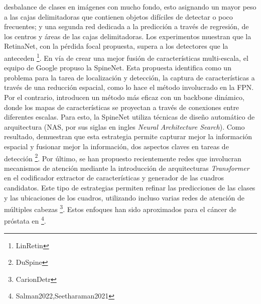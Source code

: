 desbalance de clases en imágenes con mucho fondo, esto asignando un mayor peso a las cajas delimitadoras que contienen objetos difíciles de detectar o poco frecuentes; y una segunda red dedicada a la predicción a través de regresión, de los centros y áreas de las cajas delimitadoras. Los experimentos muestran que la RetinaNet, con la pérdida focal propuesta, supera a los detectores que la anteceden \footnote{LinRetin}. 
En vía de crear una mejor fusión de características multi-escala, el equipo de Google propuso la SpineNet. Esta propuesta identifica como un problema para la tarea de localización y detección, la captura de características a través de una reducción espacial, como lo hace el método involucrado en la FPN. Por el contrario, introducen un método más eficaz con un backbone dinámico, donde los mapas de características se proyectan a través de conexiones entre diferentes escalas. Para esto, la SpineNet utiliza técnicas de diseño automático de arquitectura (NAS, por sus siglas en ingles \textit{Neural Architecture Search}). Como resultado, demuestran que esta estrategia permite capturar mejor la información espacial y fusionar mejor la información, dos aspectos claves en tareas de detección \footnote{DuSpine}. Por último, se han propuesto recientemente redes que involucran mecanismos de atención mediante la introducción de arquitecturas \textit{Transformer} en el codificador extractor de características y generador de las cuadros candidatos. Este tipo de estrategias permiten refinar las predicciones de las clases y las ubicaciones de los cuadros, utilizando incluso varias redes de atención de múltiples cabezas \footnote{CarionDetr}. Estos enfoques han sido aproximados para el cáncer de próstata en \footnote{Salman2022,Seetharaman2021}.




